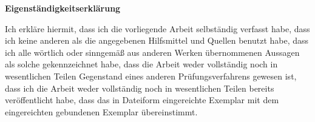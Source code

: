 \documentclass[a4paper, 12pt]{proc}
\begin{document}
\begin{center}
    \textbf{Eigenständigkeitserklärung}
\end{center}
\thispagestyle{empty}
Ich erkläre hiermit, dass ich die vorliegende Arbeit selbständig verfasst habe,
dass ich keine anderen als die angegebenen Hilfsmittel und Quellen benutzt
habe, dass ich alle wörtlich oder sinngemäß aus anderen Werken übernommenen
Aussagen als solche gekennzeichnet habe, dass die Arbeit weder vollständig noch
in wesentlichen Teilen Gegenstand eines anderen Prüfungsverfahrens gewesen ist,
dass ich die Arbeit weder vollständig noch in wesentlichen Teilen bereits
veröffentlicht habe, dass das in Dateiform eingereichte Exemplar mit dem
eingereichten gebundenen Exemplar übereinstimmt.
\end{document}

